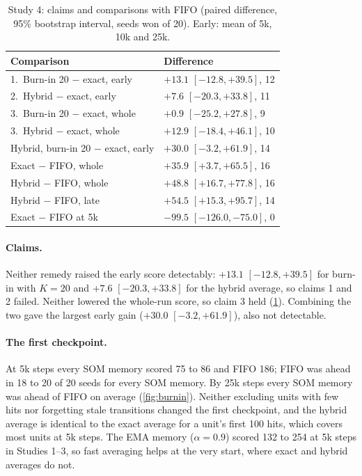 \documentclass{article}
\begin{document}
\begin{table}[t]
\caption{Study 4: claims and comparisons with FIFO (paired difference, 95\%
bootstrap interval, seeds won of 20). Early: mean of 5k, 10k and 25k.}
\label{tab:burnin}
\centering
\small
\begin{tabular}{ll}
\toprule
Comparison & Difference \\
\midrule
1.\ Burn-in 20 $-$ exact, early & $+13.1$ $[-12.8, +39.5]$, 12 \\
2.\ Hybrid $-$ exact, early & $+7.6$ $[-20.3, +33.8]$, 11 \\
3.\ Burn-in 20 $-$ exact, whole & $+0.9$ $[-25.2, +27.8]$, 9 \\
3.\ Hybrid $-$ exact, whole & $+12.9$ $[-18.4, +46.1]$, 10 \\
\quad Hybrid, burn-in 20 $-$ exact, early & $+30.0$ $[-3.2, +61.9]$, 14 \\
\midrule
\quad Exact $-$ FIFO, whole & $+35.9$ $[+3.7, +65.5]$, 16 \\
\quad Hybrid $-$ FIFO, whole & $+48.8$ $[+16.7, +77.8]$, 16 \\
\quad Hybrid $-$ FIFO, late & $+54.5$ $[+15.3, +95.7]$, 14 \\
\quad Exact $-$ FIFO at 5k & $-99.5$ $[-126.0, -75.0]$, 0 \\
\bottomrule
\end{tabular}
\end{table}

\paragraph{Claims.} Neither remedy raised the early score detectably:
$+13.1$ $[-12.8, +39.5]$ for burn-in with $K = 20$ and $+7.6$ $[-20.3,
+33.8]$ for the hybrid average, so claims 1 and 2 failed. Neither lowered the
whole-run score, so claim 3 held (\cref{tab:burnin}). Combining the two gave
the largest early gain ($+30.0$ $[-3.2, +61.9]$), also not detectable.

\paragraph{The first checkpoint.} At 5k steps every SOM memory scored 75 to
86 and FIFO 186; FIFO was ahead in 18 to 20 of 20 seeds for every SOM memory.
By 25k steps every SOM memory was ahead of FIFO on average (\cref{fig:burnin}). Neither
excluding units with few hits nor forgetting stale transitions changed the
first checkpoint, and the hybrid average is identical to the exact average
for a unit's first 100 hits, which covers most units at 5k steps. The EMA
memory ($\alpha = 0.9$) scored 132 to 254 at 5k steps in Studies 1--3, so
fast averaging helps at the very start, where exact and hybrid averages do
not.
\end{document}
